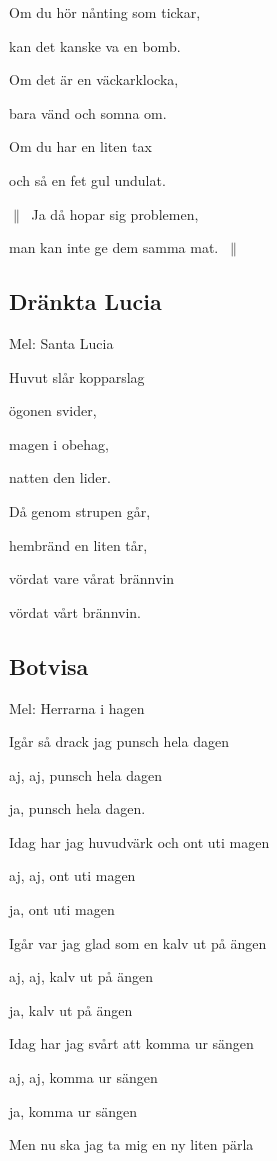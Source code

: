 Om du hör nånting som tickar,

kan det kanske va en bomb.

Om det är en väckarklocka,

bara vänd och somna om.

Om du har en liten tax

och så en fet gul undulat.

$\|\:$ Ja då hopar sig problemen,

man kan inte ge dem samma mat. $\:\|$

\subsection{\textbf{Dränkta Lucia }}

Mel: Santa Lucia\bigskip

Huvut slår kopparslag

ögonen svider,

magen i obehag,

natten den lider.

Då genom strupen går,

hembränd en liten tår,

vördat vare vårat brännvin

vördat vårt brännvin.

\subsection{\textbf{Botvisa}}

Mel: Herrarna i hagen\bigskip


Igår så drack jag punsch hela dagen

aj, aj, punsch hela dagen

ja, punsch hela dagen.\bigskip


Idag har jag huvudvärk och ont uti magen

aj, aj, ont uti magen

ja, ont uti magen\bigskip


Igår var jag glad som en kalv ut på ängen

aj, aj, kalv ut på ängen

ja, kalv ut på ängen\bigskip


Idag har jag svårt att komma ur sängen

aj, aj, komma ur sängen

ja, komma ur sängen\bigskip


Men nu ska jag ta mig en ny liten pärla

